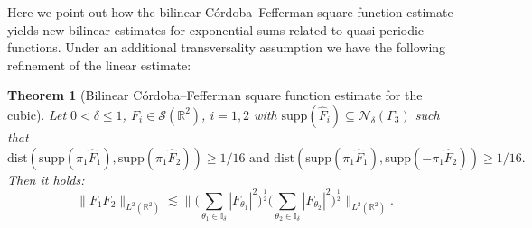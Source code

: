 \documentclass[10pt,a4paper]{amsart}
\newtheorem{theorem}{Theorem}[section]
\newcommand{\R}{\mathbb{R}}
\begin{document}
Here we point out how the bilinear C\'ordoba--Fefferman square function estimate yields new bilinear estimates for exponential sums related to quasi-periodic functions. Under an additional transversality assumption we have the following refinement of the linear estimate:
\begin{theorem}[Bilinear C\'ordoba--Fefferman square function estimate for the cubic]
Let $0 < \delta \leq 1$, $F_i \in \mathcal{S}(\R^2)$, $i=1,2$ with $\text{supp}(\hat{F}_i) \subseteq \mathcal{N}_{\delta}(\Gamma_3)$ such that
\begin{equation*}
\text{dist}(\text{supp}(\pi_1 \hat{F}_1),\text{supp}(\pi_1 \hat{F}_2)) \geq 1/16 \text{ and }
\text{dist}(\text{supp}(\pi_1 \hat{F}_1),\text{supp}(- \pi_1 \hat{F}_2)) \geq 1/16.
\end{equation*}
Then it holds:
\begin{equation*}
\| F_1 F_2 \|_{L^2(\R^2)} \lesssim \big\| \big( \sum_{\theta_1 \in \mathbb{I}_{\delta}} |F_{\theta_1}|^2 \big)^{\frac{1}{2}} \big( \sum_{\theta_2 \in \mathbb{I}_{\delta}} |F_{\theta_2}|^2 \big)^{\frac{1}{2}} \big\|_{L^2(\R^2)}.
\end{equation*}
\end{theorem}
\end{document}
